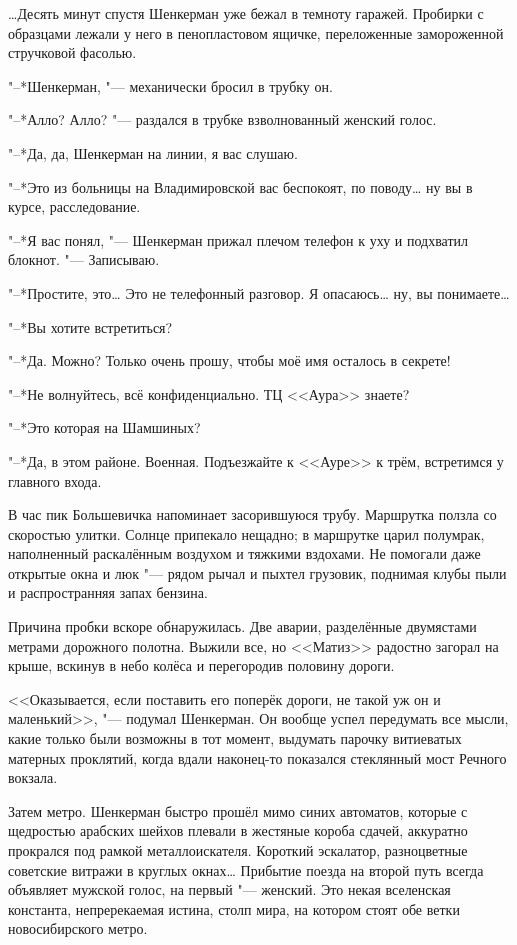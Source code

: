 \dots{}Десять минут спустя Шенкерман уже бежал в темноту гаражей.
Пробирки с образцами лежали у него в пенопластовом ящичке, переложенные замороженной стручковой фасолью.

\asterism

\textspace

\label{Wed_2012_08_29}

"--*Шенкерман, "--- механически бросил в трубку он.

"--*Алло? Алло? "--- раздался в трубке взволнованный женский голос.

"--*Да, да, Шенкерман на линии, я вас слушаю.

"--*Это из больницы на Владимировской вас беспокоят, по поводу\dots{} ну вы в курсе, расследование.

"--*Я вас понял, "--- Шенкерман прижал плечом телефон к уху и подхватил блокнот.
"--- Записываю.

"--*Простите, это\dots{}
Это не телефонный разговор.
Я опасаюсь\dots{} ну, вы понимаете\dots{}

"--*Вы хотите встретиться?

"--*Да.
Можно?
Только очень прошу, чтобы моё имя осталось в секрете!

"--*Не волнуйтесь, всё конфиденциально.
ТЦ <<Аура>> знаете?

"--*Это которая на Шамшиных?

"--*Да, в этом районе.
Военная.
Подъезжайте к <<Ауре>> к трём, встретимся у главного входа.

\asterism

В час пик Большевичка напоминает засорившуюся трубу.
Маршрутка ползла со скоростью улитки.
Солнце припекало нещадно;
в маршрутке царил полумрак, наполненный раскалённым воздухом и тяжкими вздохами.
Не помогали даже открытые окна и люк "--- рядом рычал и пыхтел грузовик, поднимая клубы пыли и распространняя запах бензина.

Причина пробки вскоре обнаружилась.
Две аварии, разделённые двумястами метрами дорожного полотна.
Выжили все, но <<Матиз>> радостно загорал на крыше, вскинув в небо колёса и перегородив половину дороги.

<<Оказывается, если поставить его поперёк дороги, не такой уж он и маленький>>, "--- подумал Шенкерман.
Он вообще успел передумать все мысли, какие только были возможны в тот момент, выдумать парочку витиеватых матерных проклятий, когда вдали наконец-то показался стеклянный мост Речного вокзала.

Затем метро.
Шенкерман быстро прошёл мимо синих автоматов, которые с щедростью арабских шейхов плевали в жестяные короба сдачей, аккуратно прокрался под рамкой металлоискателя.
Короткий эскалатор, разноцветные советские витражи в круглых окнах\dots{}
Прибытие поезда на второй путь всегда объявляет мужской голос, на первый "--- женский.
Это некая вселенская константа, непререкаемая истина, столп мира, на котором стоят обе ветки новосибирского метро.

